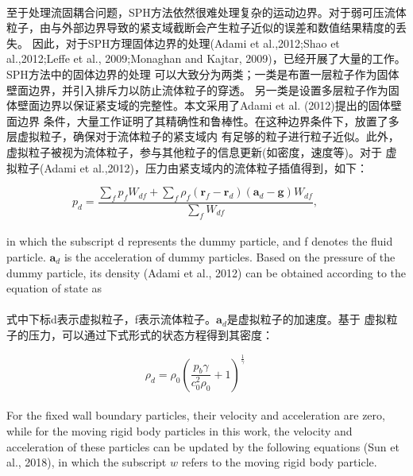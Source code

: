 \documentclass[UTF8]{ctexart}
\begin{document}
\paragraph{\quad}至于处理流固耦合问题，SPH方法依然很难处理复杂的运动边界。对于弱可压流体
                粒子，由与外部边界导致的紧支域截断会产生粒子近似的误差和数值结果精度的丢失。
                因此，对于SPH方理固体边界的处理(Adami et al.,2012;Shao et al.,2012;Leffe et al., 
                2009;Monaghan and Kajtar, 2009)，已经开展了大量的工作。SPH方法中的固体边界的处理
                可以大致分为两类；一类是布置一层粒子作为固体壁面边界，并引入排斥力以防止流体粒子的穿透。
                另一类是设置多层粒子作为固体壁面边界以保证紧支域的完整性。本文采用了Adami et al. (2012)提出的固体壁面边界
                条件，大量工作证明了其精确性和鲁棒性。在这种边界条件下，放置了多层虚拟粒子，确保对于流体粒子的紧支域内
                有足够的粒子进行粒子近似。此外，虚拟粒子被视为流体粒子，参与其他粒子的信息更新(如密度，速度等)。对于
                虚拟粒子(Adami et al.,2012)，压力由紧支域内的流体粒子插值得到，如下：

\begin{equation}
   p_d = \frac{\sum_{f}p_f W_{df} + \sum_{f}\rho_f(\mathbf{r}_f-\mathbf{r}_d)(\mathbf{a}_d-\mathbf{g})W_{df}}{\sum_{f}W_{df}}, \qquad
\end{equation}

\paragraph{\quad}in which the subscript d represents the dummy particle, 
                and f denotes the fluid particle. $\mathbf{a}_d$ is the acceleration 
                of dummy particles. Based on the pressure of the dummy 
                particle, its density (Adami et al., 2012) can be obtained 
                according to the equation of state as
\paragraph{\quad}式中下标d表示虚拟粒子，f表示流体粒子。$\mathbf{a}_d$是虚拟粒子的加速度。基于
                虚拟粒子的压力，可以通过下式形式的状态方程得到其密度：


\begin{equation}
   \rho_d = \rho_0(\frac{p_b \gamma}{c_0^2\rho_0}+1)^{\frac{1}{\gamma}} \qquad 
\end{equation}

\paragraph{\quad}For the fixed wall boundary particles, their velocity and 
                acceleration are zero, while for the moving rigid body 
                particles in this work, the velocity and acceleration 
                of these particles can be updated by the following 
                equations (Sun et al., 2018), in which the subscript $ w$ 
                refers to the moving rigid body particle.
\end{document}
